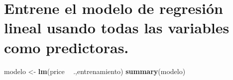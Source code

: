 \documentclass[
]{article}
\newenvironment{Shaded}{\begin{snugshade}}{\end{snugshade}}
\newcommand{\CommentTok}[1]{\textcolor[rgb]{0.56,0.35,0.01}{\textit{#1}}}
\newcommand{\DataTypeTok}[1]{\textcolor[rgb]{0.13,0.29,0.53}{#1}}
\newcommand{\DecValTok}[1]{\textcolor[rgb]{0.00,0.00,0.81}{#1}}
\newcommand{\FloatTok}[1]{\textcolor[rgb]{0.00,0.00,0.81}{#1}}
\newcommand{\KeywordTok}[1]{\textcolor[rgb]{0.13,0.29,0.53}{\textbf{#1}}}
\newcommand{\NormalTok}[1]{#1}
\newcommand{\OperatorTok}[1]{\textcolor[rgb]{0.81,0.36,0.00}{\textbf{#1}}}
\newcommand{\StringTok}[1]{\textcolor[rgb]{0.31,0.60,0.02}{#1}}
\begin{document}
\begin{Shaded}
\end{Shaded}

\hypertarget{entrene-el-modelo-de-regresiuxf3n-lineal-usando-todas-las-variables-como-predictoras.}{%
\section{Entrene el modelo de regresión lineal usando todas las
variables como
predictoras.}\label{entrene-el-modelo-de-regresiuxf3n-lineal-usando-todas-las-variables-como-predictoras.}}

\begin{Shaded}
\begin{Highlighting}[]
\NormalTok{modelo <-}\StringTok{ }\KeywordTok{lm}\NormalTok{(price }\OperatorTok{~}\StringTok{ }\NormalTok{.,entrenamiento)}
\KeywordTok{summary}\NormalTok{(modelo)}
\end{Highlighting}
\end{Shaded}
\end{document}
